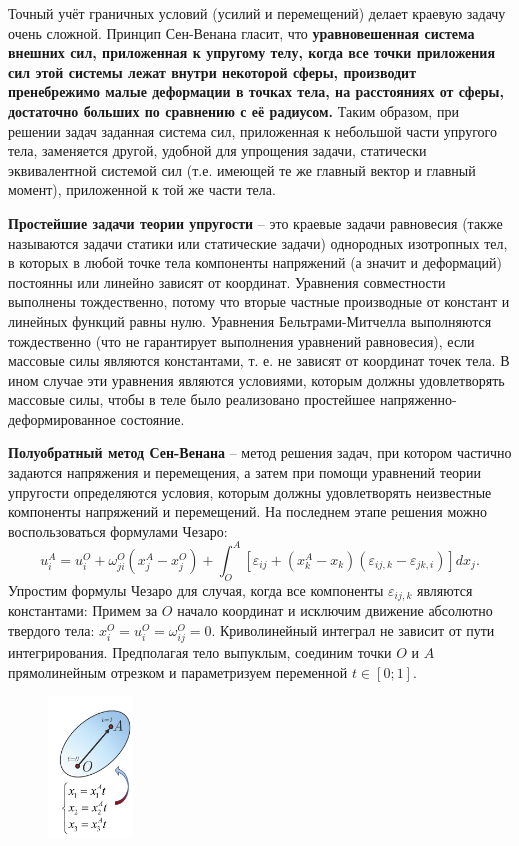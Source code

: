  

Точный учёт граничных условий (усилий и перемещений) делает краевую
задачу очень сложной. Принцип Сен-Венана гласит, что \textbf{уравновешенная
система внешних сил, приложенная к упругому телу, когда все точки
приложения сил этой системы лежат внутри некоторой сферы, производит
пренебрежимо малые деформации в точках тела, на расстояниях от
сферы, достаточно больших по сравнению с её радиусом.} Таким образом,
при решении задач заданная система сил, приложенная к небольшой части
упругого тела, заменяется другой, удобной для упрощения задачи,
статически эквивалентной системой сил (т.е. имеющей те же главный
вектор и главный момент), приложенной к той же части тела.


\textbf{Простейшие задачи теории упругости} – это краевые задачи равновесия (также называются задачи статики или статические задачи) однородных изотропных тел, в которых в любой точке тела
компоненты напряжений (а значит и деформаций) постоянны или линейно зависят от координат.
Уравнения совместности выполнены тождественно, потому что вторые частные производные от констант
и линейных функций равны нулю. Уравнения Бельтрами-Митчелла выполняются тождественно (что не гарантирует выполнения уравнений равновесия), если
массовые силы являются константами, т. е. не зависят от координат точек тела. В ином случае эти
уравнения являются условиями, которым должны удовлетворять массовые силы, чтобы в теле было
реализовано простейшее напряженно-деформированное состояние.


\textbf{Полуобратный метод Сен-Венана} – метод решения задач, при котором частично задаются напряжения и
перемещения, а затем при помощи уравнений теории упругости определяются условия, которым должны
удовлетворять неизвестные компоненты напряжений и перемещений. На последнем этапе решения
можно воспользоваться формулами Чезаро:
$$
u_i^A=u_i^O+\omega_{j i}^O\left(x_j^A-x_j^O\right)+\int_O^A\left[\varepsilon_{i j}+\left(x_k^A-x_k\right)\left(\varepsilon_{i j, k}-\varepsilon_{j k, i}\right)\right] d x_j.
$$
Упростим формулы Чезаро для случая, когда все компоненты $\varepsilon_{i j, k}$ являются константами: 
Примем за $O$ начало координат и исключим движение абсолютно твердого тела: $x_i^O=u_i^O=\omega_{i j}^O=0$.
Криволинейный интеграл не зависит от пути интегрирования. Предполагая тело выпуклым, соединим точки $O$ и $A$ прямолинейным отрезком и параметризуем переменной $t \in[0 ; 1]$.

\begin{figure}[h!]
  \centering
  \includegraphics[width=0.2\textwidth]{images/14.2.jpg}  
\end{figure}

